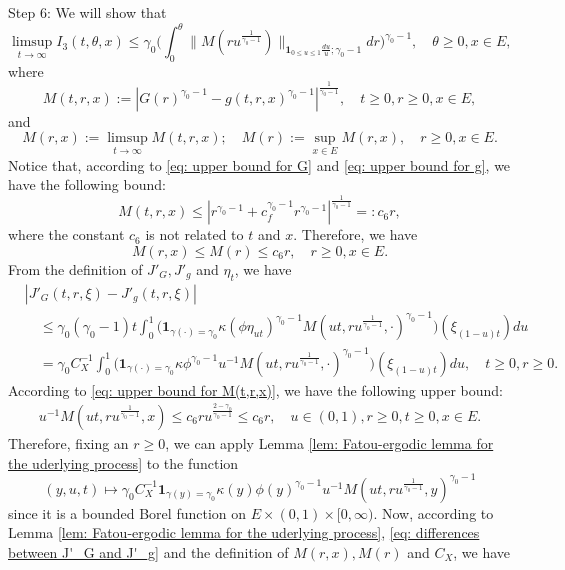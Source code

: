 \documentclass[12pt, a4paper]{amsart}
\theoremstyle{definition}
\numberwithin{equation}{section}
\begin{document}
	Step 6: We will show that
\[
	\limsup_{t\to \infty} I_3(t,\theta,x)
	\leq \gamma_0 \Big(  \int_0^\theta  \| M(r u^{\frac{1}{\gamma_0 - 1}}) \|_{\mathbf 1_{0\leq u\leq 1}\frac{du}{u};\gamma_0 - 1}  dr\Big)^{\gamma_0 - 1},
	\quad \theta \geq 0, x\in E,
\]
	where
\[
	M(t,r,x)
	:= |G(r)^{\gamma_0 - 1} - g(t,r,x)^{\gamma_0 - 1}|^{\frac{1}{\gamma_0 - 1}},
	\quad t\geq 0, r\geq 0, x\in E,
\]
	and
\[
	M(r,x)
	:= \limsup_{t\to \infty} M(t,r,x);
	\quad M(r):= \sup_{x\in E} M(r,x),
	\quad r\geq 0, x\in E.
\]
	Notice that,
	according to \eqref{eq: upper bound for G} and \eqref{eq: upper bound for g}, we have the following bound:
\[\label{eq: upper bound for M(t,r,x)}
	M(t,r,x)
	\leq |r^{\gamma_0 - 1} + c_f^{\gamma_0 - 1} r^{\gamma_0 - 1} | ^{\frac{1}{\gamma_0 - 1}}
	=: c_6 r,
\]
	where the constant $c_6$ is not related to $t$ and $x$.
	Therefore, we have
\[
	M(r,x)
	\leq M(r)
	\leq c_6 r,
	\quad r\geq 0, x\in E.
\]	
	From the definition of $J'_G, J'_g$ and $\eta_t$, we have
\[\label{eq: differences between J'_G and J'_g}\begin{split}
	&|J'_G(t,r,\xi) - J'_g(t,r,\xi)|
	\\&\quad \leq \gamma_0(\gamma_0 - 1) t \int_0^1 \big( \mathbf 1_{\gamma(\cdot) = \gamma_0} \kappa (\phi \eta_{ut})^{\gamma_0 - 1} M(ut,ru^{\frac{1}{\gamma_0 - 1}},\cdot)^{\gamma_0 - 1}\big)(\xi_{(1-u)t}) du
	\\&\quad = \gamma_0 C_X^{-1}\int_0^1 \big( \mathbf 1_{\gamma(\cdot) = \gamma_0} \kappa  \phi^{\gamma_0 - 1}  u^{-1} M(ut,ru^{\frac{1}{\gamma_0 - 1}},\cdot)^{\gamma_0 - 1}\big)(\xi_{(1-u)t}) du,
	\quad t\geq 0, r\geq 0.
\end{split}\]
	According to \eqref{eq: upper bound for M(t,r,x)}, we have the following upper bound:
\[\begin{split}
		u^{-1} M(ut,ru^{\frac{1}{\gamma_0 - 1}}, x)
		\leq c_6 ru^{\frac{2-\gamma_0}{\gamma_0 - 1}}
		\leq c_6 r,
		\quad u\in (0,1), r\geq 0, t\geq 0, x\in E.
\end{split}\]
	Therefore, fixing an $r\geq 0$, we can apply Lemma \ref{lem: Fatou-ergodic lemma for the uderlying process} to the function
\[
	(y,u,t)
	\mapsto \gamma_0 C_X^{-1}\mathbf 1_{\gamma(y) = \gamma_0} \kappa(y)  \phi(y)^{\gamma_0 - 1}  u^{-1} M(ut,ru^{\frac{1}{\gamma_0 - 1}},y)^{\gamma_0 - 1}
\]
	since it is a bounded Borel function on $E\times (0,1) \times [0,\infty)$.
	Now, according to Lemma \ref{lem: Fatou-ergodic lemma for the uderlying process},  \eqref{eq: differences between J'_G and J'_g} and the definition of $M(r,x), M(r)$ and $C_X$, we have
\end{document}
